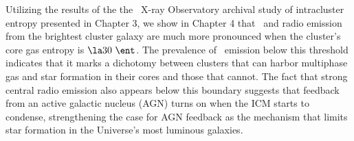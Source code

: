 \documentclass[11pt]{article}
\begin{document}
Utilizing the results of the the \chandra\ X-ray Observatory archival
study of intracluster entropy presented in Chapter 3, we show in
Chapter 4 that \halpha\ and radio emission from the brightest cluster
galaxy are much more pronounced when the cluster's core gas entropy is
$\la 30 ~\ent$. The prevalence of \halpha\ emission below this
threshold indicates that it marks a dichotomy between clusters that
can harbor multiphase gas and star formation in their cores and those
that cannot. The fact that strong central radio emission also appears
below this boundary suggests that feedback from an active galactic
nucleus (AGN) turns on when the ICM starts to condense, strengthening
the case for AGN feedback as the mechanism that limits star formation
in the Universe's most luminous galaxies.


\end{document}
